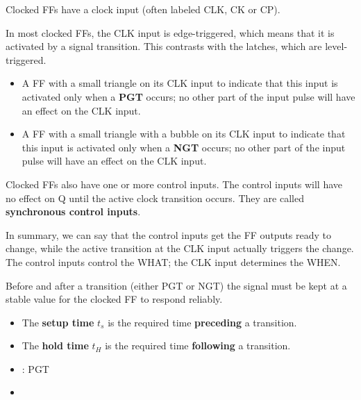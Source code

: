         \par Clocked FFs have a clock input (often labeled CLK, CK or CP).
        \par In most clocked FFs, the CLK input is edge-triggered, which means
        that it is activated by a signal transition.
        This contrasts with the latches, which are level-triggered.
        \begin{itemize}
            \item A FF with a small triangle on its CLK input to indicate
              that this input is activated only when a \textbf{PGT} occurs;
              no other part of the input pulse will have an effect
              on the CLK input.
            \item A FF with a small triangle with a bubble on its CLK input to indicate
              that this input is activated only when a \textbf{NGT}
             occurs; no other part of the input pulse will have an effect
            on the CLK input.
        \end{itemize}
        \par Clocked FFs also have one or more control inputs. The control
        inputs will have no effect on Q until the active clock transition occurs.
        They are called \textbf{synchronous control inputs}.
        \par In summary, we can say that the control inputs get the FF outputs ready
        to change, while the active transition at the CLK input actually triggers
        the change. The control inputs control the WHAT; the CLK input determines the WHEN.

        \par Before and after a transition (either PGT or NGT) the signal
        must be kept at a stable value for the clocked FF to respond reliably.
        \begin{itemize}
          \item The \textbf{setup time} $t_{s}$ is the required time
              \textbf{preceding} a transition.
          \item The \textbf{hold time} $t_{H}$ is the required time
              \textbf{following} a transition.
        \end{itemize}

\begin{itemize}
  \item {}: PGT
  \item {}
\end{itemize}

